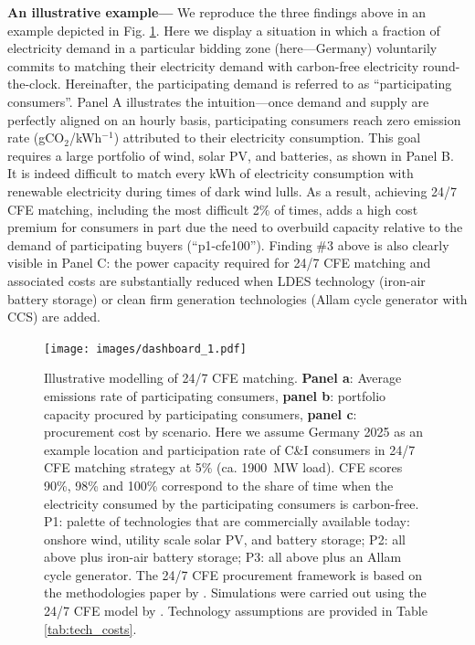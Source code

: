 \documentclass[pdflatex,sn-basic, Numbered]{sn-jnl}%
\theoremstyle{thmstyleone}%
\theoremstyle{thmstyletwo}%
\theoremstyle{thmstylethree}%
\begin{document}
\textbf{An illustrative example---} We reproduce the three findings above in an example depicted in Fig. \ref{fig:dashboard}.
Here we display a situation in which a fraction of electricity demand in a particular bidding zone (here---Germany) voluntarily commits to matching their electricity demand with carbon-free electricity round-the-clock.
Hereinafter, the participating demand is referred to as \enquote{participating consumers}.
Panel A illustrates the intuition---once demand and supply are perfectly aligned on an hourly basis, participating consumers reach zero emission rate (gCO$_2$/kWh$^{-1}$) attributed to their electricity consumption. This goal requires a large portfolio of wind, solar PV, and batteries, as shown in Panel B. It is indeed difficult to match every kWh of electricity consumption with renewable electricity during times of dark wind lulls. As a result, achieving 24/7 CFE matching, including the most difficult 2\% of times, adds a high cost premium for consumers in part due the need to overbuild capacity relative to the demand of participating buyers (\enquote{p1-cfe100}). Finding \#3 above is also clearly visible in Panel C: the power capacity required for 24/7 CFE matching and associated costs are substantially reduced when LDES technology (iron-air battery storage) or clean firm generation technologies (Allam cycle generator with CCS) are added.

\begin{figure}[htbp]
    \centering
    \texttt{[image: images/dashboard\_1.pdf]}
    \captionsetup{width=\textwidth}
    \caption{Illustrative modelling of 24/7 CFE matching.
    \textbf{Panel a}: Average emissions rate of participating consumers,
    \textbf{panel b}: portfolio capacity procured by participating consumers,
    \textbf{panel c}: procurement cost by scenario.
    Here we assume Germany 2025 as an example location and participation rate of C\&I consumers in 24/7 CFE matching strategy at 5\% (ca. 1900~MW load).
    CFE scores 90\%, 98\% and 100\% correspond to the share of time when the electricity consumed by the participating consumers is carbon-free.
    P1: palette of technologies that are commercially available today: onshore wind, utility scale solar PV, and battery storage; P2: all above plus iron-air battery storage; P3: all above plus an Allam cycle generator. The 24/7 CFE procurement framework is based on the methodologies paper by \citet{google-methodologies}. Simulations were carried out using the 24/7 CFE model by \citet{riepin-zenodo-systemlevel247}. Technology assumptions are provided in Table \ref{tab:tech_costs}.\\
    }\label{fig:dashboard}
\end{figure}
\end{document}
